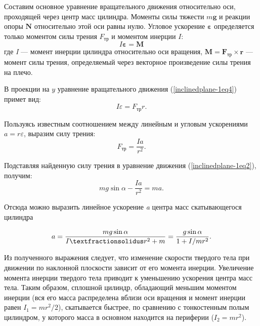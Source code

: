 \documentclass[14pt,a4paper,oneside]{extarticle}	%
\begin{document}
	Составим основное уравнение вращательного движения относительно оси, проходящей через центр масс цилиндра. 
	Моменты силы тяжести  $	m\textbf{g} $ и реакции опоры $ \textbf{N} $ относительно этой оси равны нулю. 
	Угловое ускорение $ \textbf{ε} $ определяется только моментом силы трения $ F_{\text{тр}} $ и моментом инерции $ I $:
	\begin{equation}\label{inclinedplane-1eq4}
	 I\textbf{ε}=\textbf{M}
	\end{equation}
	где \textit{I} — момент инерции цилиндра относительно оси вращения, \linebreak $ \textbf{M} = \textbf{F}_{\text{тр}}\times \textbf{r} $ — момент силы трения, определяемый через векторное произведение силы трения на плечо.
	
	В проекции на $ y $ уравнение вращательного  движения (\ref{inclinedplane-1eq4}) примет вид:
	\begin{equation}\label{inclinedplane-1eq5}
	I\varepsilon = F_{\text{тр}} r.
	\end{equation}
	 
	Пользуясь известным соотношением между линейным и угловым ускорениями $ a = r\varepsilon $, выразим силу трения:
	\begin{equation}\label{inclinedplane-1eq6}
	F_{\text{тр}} = \frac{Ia}{r^{2}}.
	\end{equation}

	Подставляя найденную силу трения в уравнение движения (\ref{inclinedplane-1eq2}), получим:
		\begin{equation}\label{inclinedplane-1eq7}
		mg\sin\alpha -  \frac{Ia}{r^{2}} = ma.
	\end{equation}
	
	Отсюда можно выразить линейное ускорение \textit{a} центра масс скатывающегося цилиндра  

	\begin{equation}\label{8}
	a=  \frac{mg\sin\alpha}{I\textfractionsolidus r^{2} + m}  = \frac{g\sin\alpha}{1 + I/mr^{2}}.
	\end{equation} 
	  
	  Из полученного выражения следует, что изменение скорости твердого тела при движении по наклонной плоскости зависит от его момента инерции.
	 Увеличение момента инерции твердого тела приводит к уменьшению ускорения центра масс тела.
	 Таким образом, сплошной цилиндр, обладающий меньшим моментом инерции (вся его масса распределена вблизи оси вращения и момент инерции равен $ I_{1} = mr^{2}/2 $), скатывается быстрее, по сравнению с тонкостенным полым цилиндром, у которого масса в основном находится на периферии ($ I_{2} = mr^{2}  $).    
	
\end{document}
